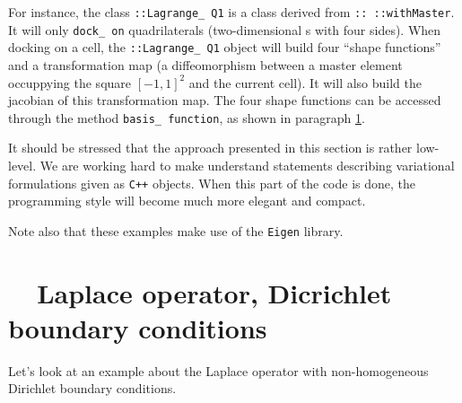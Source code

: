 For instance, the class {\small\tt {}::Lagrange\_\,Q1} is a class derived from
{\small\tt {}:: ::withMaster}.
It will only {\small\tt dock\_\,on} quadrilaterals (two-dimensional {\small\tt {}}s
with four sides).
When docking on a cell, the {\small\tt {}::Lagrange\_\,Q1} object will build four
``shape functions'' and a transformation map (a diffeomorphism between a master element
occuppying the square $ [-1, 1]^2 $ and the current cell).
It will also build the jacobian of this transformation map.
The four shape functions can be accessed through the method {\small\tt basis\_\,function},
as shown in paragraph \ref{\numb section 6.\numb parag 2}.

It should be stressed that the approach presented in this section is rather low-level.
We are working hard to make {\maniFEM} understand statements describing variational
formulations given as {\tt C++} objects.
When this part of the code is done, the programming style will become much more elegant
and compact.

Note also that these examples make use of the {\small\tt Eigen} library.


\section{~~Laplace operator, Dicrichlet boundary conditions}\label{\numb section 6.\numb parag 2}
\vskip 1mm

Let's look at an example about the Laplace operator with non-homogeneous Dirichlet
boundary conditions.
\vskip 1mm

